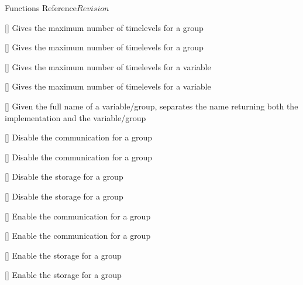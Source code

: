 \begin{cactuspart}{ Functions Reference}{}{$Revision$}
\begin{Lentry}
\item[\code{CCTK\_DeclaredTimeLevelsGI}] [\pageref{CCTK-DeclaredTimeLevelsGI}]
  Gives the maximum number of timelevels for a group

\item[\code{CCTK\_DeclaredTimeLevelsGN}] [\pageref{CCTK-DeclaredTimeLevelsGN}]
  Gives the maximum number of timelevels for a group

\item[\code{CCTK\_DeclaredTimeLevelsVI}] [\pageref{CCTK-DeclaredTimeLevelsVI}]
  Gives the maximum number of timelevels for a variable

\item[\code{CCTK\_DeclaredTimeLevelsVN}] [\pageref{CCTK-DeclaredTimeLevelsVN}]
  Gives the maximum number of timelevels for a variable

\item[\code{CCTK\_DecomposeName}] [\pageref{CCTK-DecomposeName}]
  Given the full name of a variable/group, separates the name
  returning both the implementation and the variable/group

\item[\code{CCTK\_DisableGroupComm}] [\pageref{CCTK-DisableGroupComm}]
  Disable the communication for a group

\item[\code{CCTK\_DisableGroupCommI}] [\pageref{CCTK-DisableGroupCommI}]
  Disable the communication for a group

\item[\code{CCTK\_DisableGroupStorage}] [\pageref{CCTK-DisableGroupStorage}]
  Disable the storage for a group

\item[\code{CCTK\_DisableGroupStorageI}] [\pageref{CCTK-DisableGroupStorageI}]
  Disable the storage for a group

\item[\code{CCTK\_EnableGroupComm}] [\pageref{CCTK-EnableGroupComm}]
  Enable the communication for a group

\item[\code{CCTK\_EnableGroupCommI}] [\pageref{CCTK-EnableGroupCommI}]
  Enable the communication for a group

\item[\code{CCTK\_EnableGroupStorage}] [\pageref{CCTK-EnableGroupStorage}]
  Enable the storage for a group

\item[\code{CCTK\_EnableGroupStorageI}] [\pageref{CCTK-EnableGroupStorageI}]
  Enable the storage for a group


\end{Lentry}
\end{cactuspart}
